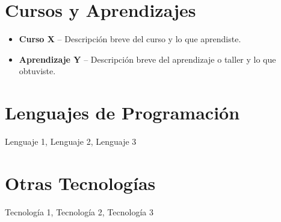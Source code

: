\documentclass[a4paper,10pt]{article}
\newenvironment{tightitemize}{
\begin{itemize}[noitemsep,topsep=0pt]
}{\end{itemize}}
\begin{document}
\section*{Cursos y Aprendizajes}
\begin{tightitemize}
    \item \textbf{Curso X} -- Descripción breve del curso y lo que aprendiste.
    \item \textbf{Aprendizaje Y} -- Descripción breve del aprendizaje o taller y lo que obtuviste.
\end{tightitemize}

\section*{Lenguajes de Programación}
Lenguaje 1, Lenguaje 2, Lenguaje 3

\section*{Otras Tecnologías}
Tecnología 1, Tecnología 2, Tecnología 3
\end{document}
